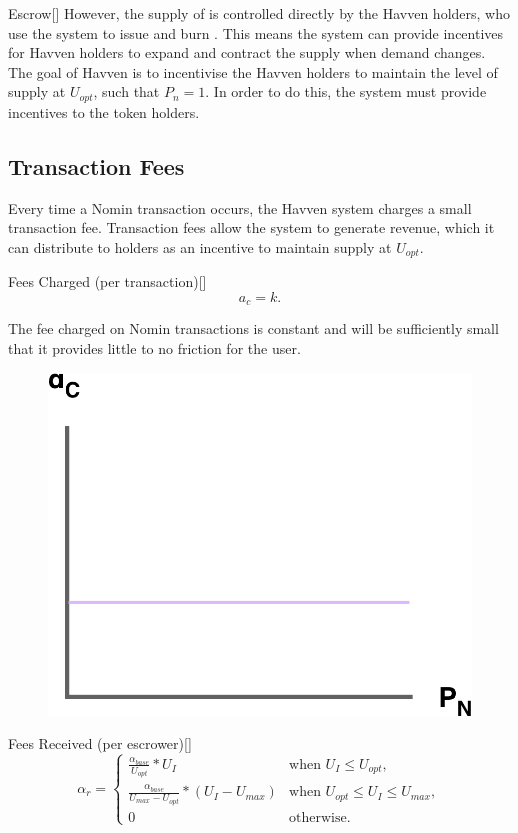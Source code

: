 \begin{namedthm*}{Escrow}[]
\noindent However, the supply of \NOM{} is controlled directly by the Havven holders, who use the system to issue and burn \NOM{}. This means the system can provide incentives for Havven holders to expand and contract the \NOM{} supply when demand changes. \\

\noindent The goal of Havven is to incentivise the Havven holders to maintain the level of \NOM{} supply at $U_{opt}$, such that $P_n = 1$. In order to do this, the system must provide incentives to the \HAV{} token holders.  \\

\newpage

\subsection{Transaction Fees} Every time a Nomin transaction occurs, the Havven system charges a small transaction fee. Transaction fees allow the system to generate revenue, which it can distribute to \HAV{} holders as an incentive to maintain \NOM{} supply at $U_{opt}$. \\

\begin{namedthm}{Fees Charged (per transaction)}[]
$$ a_c = k.$$
\end{namedthm}

\noindent The fee charged on Nomin transactions is constant and will be sufficiently small that it provides little to no friction for the user. \\

\begin{figure}[h!]
    \centering
    \includegraphics[width=.55\textwidth]{img/fees-charged}
\end{figure}

\newpage

\begin{namedthm}{Fees Received (per escrower)}[]
\[
\alpha_r = 
\begin{cases}
 \frac{\alpha_{base}}{U_{opt}} * U_I &\mbox{when } U_I \leq U_{opt}, \\ 
 \frac{\alpha_{base}}{U_{max} - U_{opt}} * (U_I  - U_{max}) &\mbox{when } U_{opt} \leq U_I \leq U_{max}, \\ 
 0 &\mbox{otherwise}.
 \end{cases}
\]
\end{namedthm}


\end{namedthm*}
